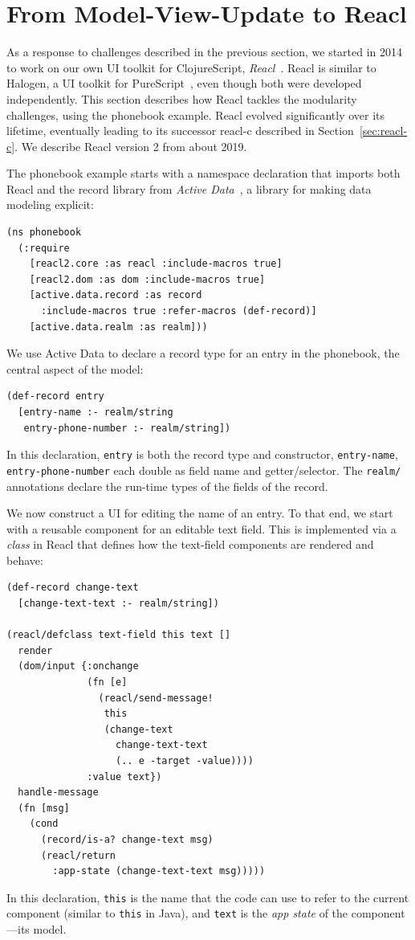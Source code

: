 \documentclass[sigplan,screen]{acmart}
\begin{document}
\section{From Model-View-Update to Reacl}
\label{sec:reacl}

As a response to challenges described in the previous section, we
started in 2014 to work on our own UI toolkit for ClojureScript,
\textit{Reacl}~\cite{Reacl}.  Reacl is similar to Halogen, a UI
toolkit for PureScript~\cite{Halogen}, even though both were developed
independently.
This section describes how Reacl tackles
the modularity challenges, using the phonebook example.  Reacl evolved
significantly over its lifetime, eventually leading to its successor
reacl-c described in Section~\ref{sec:reacl-c}.  We describe Reacl version 2
from about 2019.

The phonebook example starts with a namespace declaration that imports
both Reacl and the record library from \textit{Active
  Data}~\cite{ActiveData}, a library for making data modeling
explicit:
%
\begin{verbatim}
(ns phonebook
  (:require
    [reacl2.core :as reacl :include-macros true]
    [reacl2.dom :as dom :include-macros true]
    [active.data.record :as record
      :include-macros true :refer-macros (def-record)]
    [active.data.realm :as realm]))
\end{verbatim}
%
We use Active Data to declare a record type for an entry in the
phonebook, the central aspect of the model:
%
\begin{verbatim}
(def-record entry
  [entry-name :- realm/string
   entry-phone-number :- realm/string])
\end{verbatim}
%
In this declaration, \texttt{entry} is both the record type and
constructor, \texttt{entry-name},
\texttt{entry-phone-number} each double as field name and
getter/selector.  The \texttt{realm/} annotations declare the run-time
types of the fields of the record.

We now construct a UI for editing the name of an entry.  To that end,
we start with a reusable component for an editable text field.  This
is implemented via a \textit{class} in Reacl that defines how the
text-field components are rendered and behave:
%
\begin{verbatim}
(def-record change-text
  [change-text-text :- realm/string])

(reacl/defclass text-field this text []
  render
  (dom/input {:onchange 
              (fn [e]
                (reacl/send-message!
                 this
                 (change-text
                   change-text-text
                   (.. e -target -value))))
              :value text})
  handle-message
  (fn [msg]
    (cond
      (record/is-a? change-text msg)
      (reacl/return
        :app-state (change-text-text msg)))))
\end{verbatim}
%
In this declaration, \texttt{this} is the name that the code can use
to refer to the current component (similar to \texttt{this} in Java),
and \texttt{text} is the \textit{app state} of the component---its
model.
\end{document}
